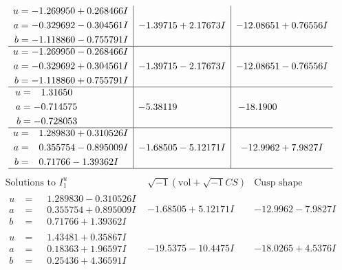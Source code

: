 \documentclass[1p]{elsarticle_modified}
\theoremstyle{definition}
\newcommand{\I}{\sqrt{-1}}
\begin{document}
$$\begin{array}{c|c|c}
\begin{aligned}
u &= -1.269950 + 0.268466 I \\
a &= -0.329692 - 0.304561 I \\
b &= -1.118860 - 0.755791 I\end{aligned}
 & -1.39715 + 2.17673 I & -12.08651 + 0.76556 I \\ \hline\begin{aligned}
u &= -1.269950 - 0.268466 I \\
a &= -0.329692 + 0.304561 I \\
b &= -1.118860 + 0.755791 I\end{aligned}
 & -1.39715 - 2.17673 I & -12.08651 - 0.76556 I \\ \hline\begin{aligned}
u &= \phantom{-}1.31650\phantom{ +0.000000I} \\
a &= -0.714575\phantom{ +0.000000I} \\
b &= -0.728053\phantom{ +0.000000I}\end{aligned}
 & -5.38119\phantom{ +0.000000I} & -18.1900\phantom{ +0.000000I} \\ \hline\begin{aligned}
u &= \phantom{-}1.289830 + 0.310526 I \\
a &= \phantom{-}0.355754 - 0.895009 I \\
b &= \phantom{-}0.71766 - 1.39362 I\end{aligned}
 & -1.68505 - 5.12171 I & -12.9962 + 7.9827 I\\
 \hline 
 \end{array}$$\newpage$$\begin{array}{c|c|c}  
\text{Solutions to }I^u_{1}& \I (\text{vol} + \sqrt{-1}CS) & \text{Cusp shape}\\
 \hline 
\begin{aligned}
u &= \phantom{-}1.289830 - 0.310526 I \\
a &= \phantom{-}0.355754 + 0.895009 I \\
b &= \phantom{-}0.71766 + 1.39362 I\end{aligned}
 & -1.68505 + 5.12171 I & -12.9962 - 7.9827 I \\ \hline\begin{aligned}
u &= \phantom{-}1.43481 + 0.35867 I \\
a &= \phantom{-}0.18363 + 1.96597 I \\
b &= \phantom{-}0.25436 + 4.36591 I\end{aligned}
 & -19.5375 - 10.4475 I & -18.0265 + 4.5376 I \\ \hline\begin{aligned}

\end{aligned}
\end{array}$$
\end{document}
